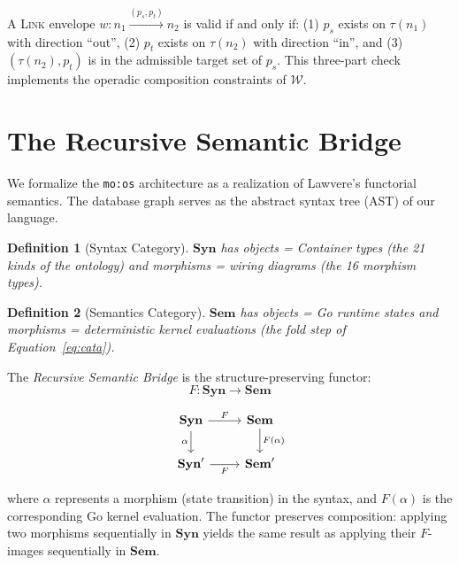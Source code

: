 \documentclass[submission,copyright,creativecommons]{eptcs}
\newtheorem{definition}{Definition}
\begin{document}
A \textsc{Link} envelope $w\colon n_1 \xrightarrow{(p_s, p_t)} n_2$ is valid
if and only if: (1) $p_s$ exists on $\tau(n_1)$ with direction ``out'', (2)
$p_t$ exists on $\tau(n_2)$ with direction ``in'', and (3) $(\tau(n_2), p_t)$
is in the admissible target set of $p_s$. This three-part check implements the
operadic composition constraints of $\mathcal{W}$.

\section{The Recursive Semantic Bridge}
\label{sec:bridge}

We formalize the \texttt{mo:os} architecture as a realization of Lawvere's
functorial semantics. The database graph serves as the abstract syntax tree
(AST) of our language.

\begin{definition}[Syntax Category]
$\mathbf{Syn}$ has objects = Container types (the 21 kinds of the ontology)
and morphisms = wiring diagrams (the 16 morphism types).
\end{definition}

\begin{definition}[Semantics Category]
$\mathbf{Sem}$ has objects = Go runtime states and morphisms = deterministic
kernel evaluations (the fold step of Equation~\ref{eq:cata}).
\end{definition}

The \emph{Recursive Semantic Bridge} is the structure-preserving functor:
\begin{equation}
F\colon \mathbf{Syn} \to \mathbf{Sem}
\end{equation}

\begin{equation}
\begin{tikzcd}
\mathbf{Syn} \arrow[r, "F"] \arrow[d, "\alpha"'] & \mathbf{Sem} \arrow[d, "F(\alpha)"] \\
\mathbf{Syn}' \arrow[r, "F"'] & \mathbf{Sem}'
\end{tikzcd}
\end{equation}

where $\alpha$ represents a morphism (state transition) in the syntax, and
$F(\alpha)$ is the corresponding Go kernel evaluation. The functor preserves
composition: applying two morphisms sequentially in $\mathbf{Syn}$ yields the
same result as applying their $F$-images sequentially in $\mathbf{Sem}$.
\end{document}
